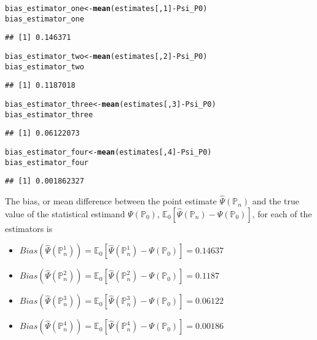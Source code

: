 \documentclass{article}\usepackage[]{graphicx}\usepackage[]{xcolor}
\makeatletter
\newcommand{\hlnum}[1]{\textcolor[rgb]{0.686,0.059,0.569}{#1}}%
\newcommand{\hlopt}[1]{\textcolor[rgb]{0,0,0}{#1}}%
\newcommand{\hlstd}[1]{\textcolor[rgb]{0.345,0.345,0.345}{#1}}%
\newcommand{\hlkwb}[1]{\textcolor[rgb]{0.69,0.353,0.396}{#1}}%
\newcommand{\hlkwd}[1]{\textcolor[rgb]{0.737,0.353,0.396}{\textbf{#1}}}%
\newenvironment{kframe}{%
 \def\at@end@of@kframe{}%
 \ifinner\ifhmode%
  \def\at@end@of@kframe{\end{minipage}}%
  \begin{minipage}{\columnwidth}%
 \fi\fi%
 \def\FrameCommand##1{\hskip\@totalleftmargin \hskip-\fboxsep
 \colorbox{shadecolor}{##1}\hskip-\fboxsep
     \hskip-\linewidth \hskip-\@totalleftmargin \hskip\columnwidth}%
 \MakeFramed {\advance\hsize-\width
   \@totalleftmargin\z@ \linewidth\hsize
   \@setminipage}}%
 {\par\unskip\endMakeFramed%
 \at@end@of@kframe}
\newenvironment{knitrout}{}{} %
\makeatother
\begin{document}
\begin{knitrout}
\color{fgcolor}\begin{kframe}
\begin{alltt}
\hlstd{bias_estimator_one} \hlkwb{<-} \hlkwd{mean}\hlstd{(estimates[,}\hlnum{1}\hlstd{]} \hlopt{-} \hlstd{Psi_P0)}
\hlstd{bias_estimator_one}
\end{alltt}
\begin{verbatim}
## [1] 0.146371
\end{verbatim}
\begin{alltt}
\hlstd{bias_estimator_two} \hlkwb{<-} \hlkwd{mean}\hlstd{(estimates[,}\hlnum{2}\hlstd{]} \hlopt{-} \hlstd{Psi_P0)}
\hlstd{bias_estimator_two}
\end{alltt}
\begin{verbatim}
## [1] 0.1187018
\end{verbatim}
\begin{alltt}
\hlstd{bias_estimator_three} \hlkwb{<-} \hlkwd{mean}\hlstd{(estimates[,}\hlnum{3}\hlstd{]} \hlopt{-} \hlstd{Psi_P0)}
\hlstd{bias_estimator_three}
\end{alltt}
\begin{verbatim}
## [1] 0.06122073
\end{verbatim}
\begin{alltt}
\hlstd{bias_estimator_four} \hlkwb{<-} \hlkwd{mean}\hlstd{(estimates[,}\hlnum{4}\hlstd{]} \hlopt{-} \hlstd{Psi_P0)}
\hlstd{bias_estimator_four}
\end{alltt}
\begin{verbatim}
## [1] 0.001862327
\end{verbatim}
\end{kframe}
\end{knitrout}
  
The bias, or mean difference between the point estimate $\hat{\Psi}(\mathbb{P}_n)$ and the true value of the statistical estimand $\Psi(\mathbb{P}_0)$, $\mathbb{E}_0[\hat{\Psi}(\mathbb{P}_n)-\Psi(\mathbb{P}_0)]$, for each of the estimators is

\begin{itemize}

  \item $Bias(\hat{\Psi}(\mathbb{P}_n^1))=\mathbb{E}_0[\hat{\Psi}(\mathbb{P}_n^1)-\Psi(\mathbb{P}_0)]=0.14637$
  \item $Bias(\hat{\Psi}(\mathbb{P}_n^2))=\mathbb{E}_0[\hat{\Psi}(\mathbb{P}_n^2)-\Psi(\mathbb{P}_0)]=0.1187$
  \item $Bias(\hat{\Psi}(\mathbb{P}_n^3))=\mathbb{E}_0[\hat{\Psi}(\mathbb{P}_n^3)-\Psi(\mathbb{P}_0)]=0.06122$
  \item $Bias(\hat{\Psi}(\mathbb{P}_n^4))=\mathbb{E}_0[\hat{\Psi}(\mathbb{P}_n^4)-\Psi(\mathbb{P}_0)]=0.00186$

\end{itemize}
\end{document}
